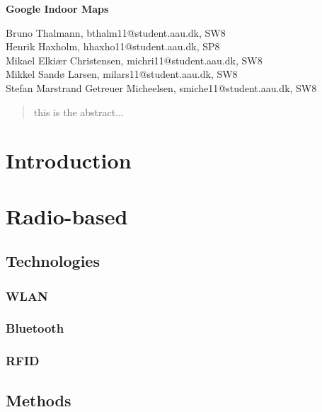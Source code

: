\documentclass[12pt,a4paper]{article}
\begin{document}
\begin{center}
\bigskip\bigskip
{\Large\bf Google Indoor Maps}
\bigskip\bigskip


Bruno Thalmann, bthalm11@student.aau.dk, SW8\\
Henrik Haxholm, hhaxho11@student.aau.dk, SP8\\
Mikael Elkiær Christensen, michri11@student.aau.dk, SW8\\
Mikkel Sandø Larsen, milars11@student.aau.dk, SW8\\
Stefan Marstrand Getreuer Micheelsen, smiche11@student.aau.dk, SW8

\bigskip
\begin{abstract}
this is the abstract...
\end{abstract}

\thispagestyle{empty}
\end{center}


\titlepage



\thispagestyle{plain}


\section{Introduction}


\section{Radio-based}
\subsection{Technologies}
\subsubsection{WLAN}

\subsubsection{Bluetooth}

\subsubsection{RFID}
\subsection{Methods}
\end{document}
